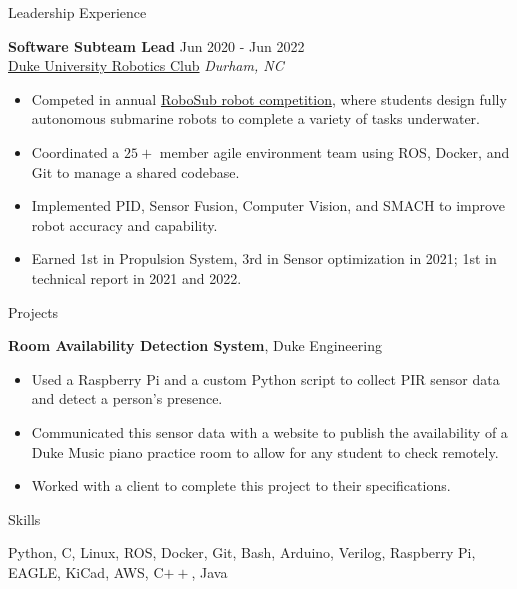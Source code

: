 \documentclass{resume}
\begin{document}
\begin{rSection}{Leadership Experience}

\textbf{Software Subteam Lead} \hfill Jun 2020 - Jun 2022\\
\href{https://duke-robotics.com/}{Duke University Robotics Club} \hfill \textit{Durham, NC}
\begin{itemize}
    \itemsep -3pt {} 
    \item Competed in annual \href{https://robonation.org/programs/robosub/}{RoboSub robot competition}, where students design fully autonomous submarine robots to complete a variety of tasks underwater.
    \item Coordinated a $25+$ member agile environment team using ROS, Docker, and Git to manage a shared codebase.
    \item Implemented PID, Sensor Fusion, Computer Vision, and SMACH to improve robot accuracy and capability.
    \item Earned 1st in Propulsion System, 3rd in Sensor optimization in 2021; 1st in technical report in 2021 and 2022.    
    \end{itemize}

\end{rSection} 


\begin{rSection}{Projects}

\textbf{Room Availability Detection System}, Duke Engineering
\begin{itemize}
    \itemsep -3pt {} 
    \item Used a Raspberry Pi and a custom Python script to collect PIR sensor data and detect a person’s presence.
    \item Communicated this sensor data with a website to publish the availability of a Duke Music piano practice room to allow for any student to check remotely.
    \item Worked with a client to complete this project to their specifications.
    \end{itemize}

\end{rSection} 

\begin{rSection}{Skills}

    Python, C, Linux, ROS, Docker, Git, Bash, Arduino, Verilog, Raspberry Pi, EAGLE, KiCad, AWS, C$++$, Java 

\end{rSection}
\end{document}
